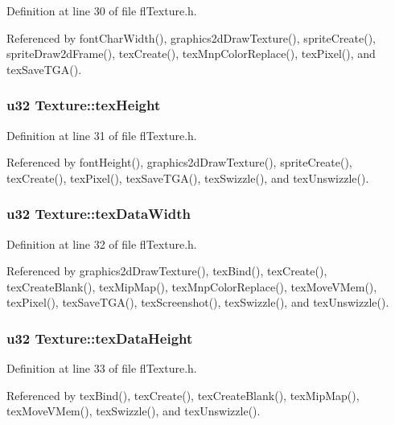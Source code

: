 Definition at line 30 of file fl\-Texture.h.

Referenced by font\-Char\-Width(), graphics2d\-Draw\-Texture(), sprite\-Create(), sprite\-Draw2d\-Frame(), tex\-Create(), tex\-Mnp\-Color\-Replace(), tex\-Pixel(), and tex\-Save\-TGA().
\subsubsection{\setlength{\rightskip}{0pt plus 5cm}u32 {\bf Texture::tex\-Height}}\label{structTexture_e1c0cacd0be001d79c758796ba0b4f8f}




Definition at line 31 of file fl\-Texture.h.

Referenced by font\-Height(), graphics2d\-Draw\-Texture(), sprite\-Create(), tex\-Create(), tex\-Pixel(), tex\-Save\-TGA(), tex\-Swizzle(), and tex\-Unswizzle().
\subsubsection{\setlength{\rightskip}{0pt plus 5cm}u32 {\bf Texture::tex\-Data\-Width}}\label{structTexture_e23e28838c5e73a89d7216c9d84a9bdd}




Definition at line 32 of file fl\-Texture.h.

Referenced by graphics2d\-Draw\-Texture(), tex\-Bind(), tex\-Create(), tex\-Create\-Blank(), tex\-Mip\-Map(), tex\-Mnp\-Color\-Replace(), tex\-Move\-VMem(), tex\-Pixel(), tex\-Save\-TGA(), tex\-Screenshot(), tex\-Swizzle(), and tex\-Unswizzle().
\subsubsection{\setlength{\rightskip}{0pt plus 5cm}u32 {\bf Texture::tex\-Data\-Height}}\label{structTexture_49f176a1b14b0d85d9e539f95a349fc3}




Definition at line 33 of file fl\-Texture.h.

Referenced by tex\-Bind(), tex\-Create(), tex\-Create\-Blank(), tex\-Mip\-Map(), tex\-Move\-VMem(), tex\-Swizzle(), and tex\-Unswizzle().
